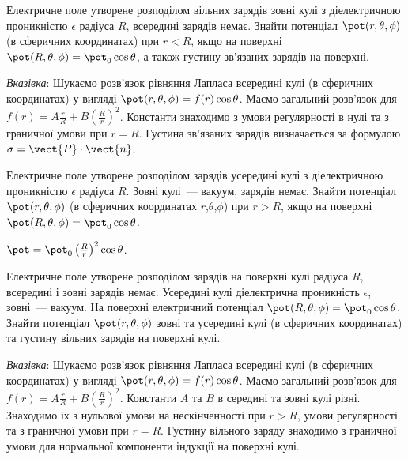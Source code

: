\begin{problem}
Електричне поле утворене розподілом вільних зарядів зовні кулі з діелектричною проникністю $\epsilon$ радіуса $R$, всередині зарядів немає. Знайти потенціал $\pot(r,\theta,\phi)$  (в сферичних координатах) при $r<R$, якщо на поверхні $\pot(R,\theta,\phi) = \pot_0\cos\theta$, а також густину зв'язаних зарядів на поверхні.
\begin{solution}
	\emph{Вказівка}: Шукаємо розв’язок рівняння Лапласа всередині кулі (в сферичних координатах)  у вигляді $\pot(r,\theta,\phi) = f(r)\cos\theta$. Маємо загальний розв'язок для  $f(r) = A\frac{r}{R} + B\left( \frac{R}{r}\right)^2$.  Константи знаходимо з умови регулярності в нулі та з граничної умови при  $r = R$. Густина зв’язаних зарядів визначається за формулою $\sigma = \vect{P}\cdot\vect{n}$.
\end{solution}
\end{problem}

\begin{problem}
Електричне поле утворене розподілом зарядів усередині кулі з діелектричною проникністю $\epsilon$ радіуса $R$. Зовні кулі~--- вакуум,  зарядів немає. Знайти потенціал $\pot(r,\theta,\phi)$ (в сферичних координатах $r$,$\theta$,$\phi$) при $r>R$, якщо на поверхні $\pot(R,\theta,\phi) = \pot_0\cos\theta$.
\begin{solution}
	$\pot = \pot_0 \left( \frac{R}{r}\right)^2\cos\theta $.
\end{solution}
\end{problem}

\begin{problem}\label{prb:OrtFunc}
Електричне поле утворене розподілом зарядів на поверхні кулі радіуса $R$, всередині і зовні зарядів немає. Усередині кулі діелектрична проникність $\epsilon$, зовні~--- вакуум. На поверхні електричний потенціал $\pot(R,\theta,\phi) = \pot_0\cos\theta$. Знайти потенціал  $\pot(r,\theta,\phi)$  зовні та усередині кулі (в сферичних координатах) та густину вільних зарядів на поверхні кулі.
\begin{solution}
	\emph{Вказівка}: Шукаємо розв’язок рівняння Лапласа всередині кулі (в сферичних координатах)  у вигляді $\pot(r,\theta,\phi) = f(r)\cos\theta$. Маємо загальний розв'язок для  $f(r) = A\frac{r}{R} + B\left( \frac{R}{r}\right)^2$.  Константи $A$ та $B$ в середині та зовні кулі різні. Знаходимо іх з нульової умови на нескінченності при $r>R$, умови регулярності та з граничної умови при  $r = R$. Густину вільного заряду знаходимо з граничної умови для нормальної компоненти індукції на поверхні кулі.
\end{solution}
\end{problem}

